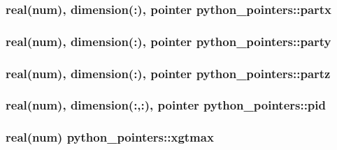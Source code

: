 \subsubsection[{\texorpdfstring{partx}{partx}}]{\setlength{\rightskip}{0pt plus 5cm}real(num), dimension(\+:), pointer python\+\_\+pointers\+::partx}\hypertarget{namespacepython__pointers_a11c207d7f4fb2d96dad5a926172277df}{}\label{namespacepython__pointers_a11c207d7f4fb2d96dad5a926172277df}
\subsubsection[{\texorpdfstring{party}{party}}]{\setlength{\rightskip}{0pt plus 5cm}real(num), dimension(\+:), pointer python\+\_\+pointers\+::party}\hypertarget{namespacepython__pointers_a7ed293531cd47aefba8bd76e2692c30d}{}\label{namespacepython__pointers_a7ed293531cd47aefba8bd76e2692c30d}
\subsubsection[{\texorpdfstring{partz}{partz}}]{\setlength{\rightskip}{0pt plus 5cm}real(num), dimension(\+:), pointer python\+\_\+pointers\+::partz}\hypertarget{namespacepython__pointers_a318b3d65ffe6c40b81bae433e093df16}{}\label{namespacepython__pointers_a318b3d65ffe6c40b81bae433e093df16}
\subsubsection[{\texorpdfstring{pid}{pid}}]{\setlength{\rightskip}{0pt plus 5cm}real(num), dimension(\+:,\+:), pointer python\+\_\+pointers\+::pid}\hypertarget{namespacepython__pointers_a8a754456a1a3440c897f9a6249782713}{}\label{namespacepython__pointers_a8a754456a1a3440c897f9a6249782713}
\subsubsection[{\texorpdfstring{xgtmax}{xgtmax}}]{\setlength{\rightskip}{0pt plus 5cm}real(num) python\+\_\+pointers\+::xgtmax}\hypertarget{namespacepython__pointers_ae4ae1714533add4e893ccdb25fb89854}{}\label{namespacepython__pointers_ae4ae1714533add4e893ccdb25fb89854}
